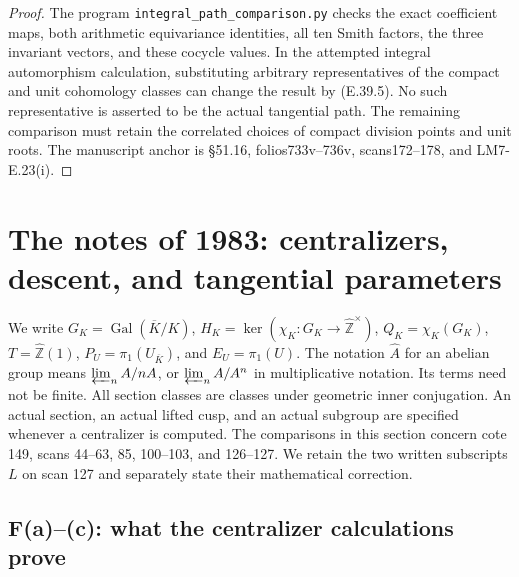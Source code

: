 \documentclass[11pt,oneside]{article}
\begin{document}
\begin{proof}
The program \texttt{integral\_path\_comparison.py}
checks the exact coefficient maps, both arithmetic
equivariance identities, all ten Smith factors, the
three invariant vectors, and these cocycle values.
In the attempted integral automorphism calculation,
substituting arbitrary representatives of the compact
and unit cohomology classes can change the result by
(E.39.5). No such representative is asserted to be the
actual tangential path. The remaining comparison must
retain the correlated choices of compact division
points and unit roots. The manuscript anchor is
\S51.16, folios733v--736v, scans172--178, and
LM7-E.23(i).
\end{proof}

\section{The notes of 1983: centralizers, descent, and tangential parameters}
\label{sec:F}

We write $G_K=\operatorname{Gal}(\overline K/K)$,
$H_K=\ker(\chi_K:G_K\to\widehat{\mathbb Z}^{\times})$,
$Q_K=\chi_K(G_K)$, $T=\widehat{\mathbb Z}(1)$,
$P_U=\pi_1(U_{\overline K})$, and $E_U=\pi_1(U)$.
The notation $\widehat{A}$ for an abelian group means
$\varprojlim_n A/nA$, or $\varprojlim_n A/A^n$ in multiplicative
notation. Its terms need not be finite. All section classes are
classes under geometric inner conjugation. An actual section, an
actual lifted cusp, and an actual subgroup are specified whenever a
centralizer is computed. The comparisons in this section concern cote
149, scans 44--63, 85, 100--103, and 126--127. We retain the two written
subscripts $L$ on scan 127 and separately state their mathematical
correction.

\subsection{F(a)--(c): what the centralizer calculations prove}
\end{document}
